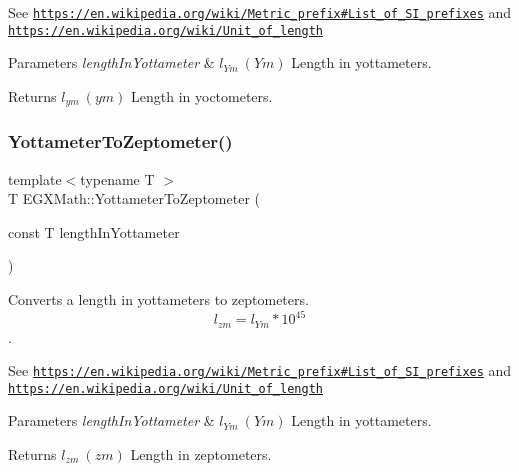 See \href{https://en.wikipedia.org/wiki/Metric_prefix#List_of_SI_prefixes}{\tt https\+://en.\+wikipedia.\+org/wiki/\+Metric\+\_\+prefix\#\+List\+\_\+of\+\_\+\+S\+I\+\_\+prefixes} and \href{https://en.wikipedia.org/wiki/Unit_of_length}{\tt https\+://en.\+wikipedia.\+org/wiki/\+Unit\+\_\+of\+\_\+length} 
\begin{DoxyParams}{Parameters}
{\em length\+In\+Yottameter} & $ l_{Ym}\ (Ym)$ Length in yottameters. \\
\hline
\end{DoxyParams}
\begin{DoxyReturn}{Returns}
$ l_{ym}\ (ym)$ Length in yoctometers. 
\end{DoxyReturn}
\mbox{\label{group___e_g_x_math-_conversions-_length_conversions-_s_i-_yottameter-_s_i_ga976c591d436c20684f2d55461a05da3e}} 
\subsubsection{\texorpdfstring{Yottameter\+To\+Zeptometer()}{YottameterToZeptometer()}}
{\footnotesize\ttfamily template$<$typename T $>$ \\
T E\+G\+X\+Math\+::\+Yottameter\+To\+Zeptometer (\begin{DoxyParamCaption}\item[{const T}]{length\+In\+Yottameter }\end{DoxyParamCaption})}



Converts a length in yottameters to zeptometers. \[ l_{zm}=l_{Ym} * 10^{45} \]. 

See \href{https://en.wikipedia.org/wiki/Metric_prefix#List_of_SI_prefixes}{\tt https\+://en.\+wikipedia.\+org/wiki/\+Metric\+\_\+prefix\#\+List\+\_\+of\+\_\+\+S\+I\+\_\+prefixes} and \href{https://en.wikipedia.org/wiki/Unit_of_length}{\tt https\+://en.\+wikipedia.\+org/wiki/\+Unit\+\_\+of\+\_\+length} 
\begin{DoxyParams}{Parameters}
{\em length\+In\+Yottameter} & $ l_{Ym}\ (Ym)$ Length in yottameters. \\
\hline
\end{DoxyParams}
\begin{DoxyReturn}{Returns}
$ l_{zm}\ (zm)$ Length in zeptometers. 
\end{DoxyReturn}
\mbox{\label{group___e_g_x_math-_conversions-_length_conversions-_s_i-_yottameter-_s_i_gaec75915fd3b267aeff37cc104cfb3e9a}} 

